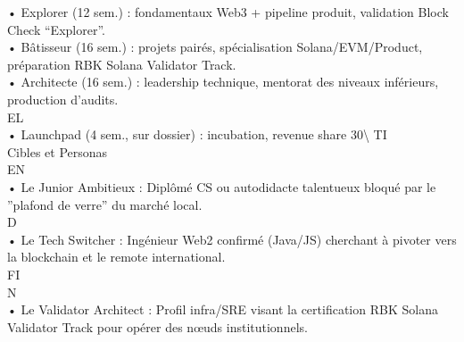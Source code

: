 \vspace{0.5em}
• Explorer (12 sem.) : fondamentaux Web3 + pipeline produit, validation Block Check “Explorer”.\\
\vspace{0.5em}
• Bâtisseur (16 sem.) : projets pairés, spécialisation Solana/EVM/Product, préparation RBK Solana Validator Track.\\
\vspace{0.5em}
• Architecte (16 sem.) : leadership technique, mentorat des niveaux inférieurs, production d’audits.\\
\vspace{0.5em}
\vspace{0.5em}
\vspace{0.5em}
\vspace{0.5em}
EL\\
• Launchpad (4 sem., sur dossier) : incubation, revenue share 30\textbackslash{}%
\vspace{0.5em}
\vspace{0.5em}
\vspace{0.5em}
\vspace{0.5em}
TI\\
Cibles et Personas\\
\vspace{0.5em}
\vspace{0.5em}
\vspace{0.5em}
\vspace{0.5em}
EN\\
• Le Junior Ambitieux : Diplômé CS ou autodidacte talentueux bloqué par le ”plafond de verre” du marché local.\\
\vspace{0.5em}
\vspace{0.5em}
\vspace{0.5em}
\vspace{0.5em}
D\\
• Le Tech Switcher : Ingénieur Web2 confirmé (Java/JS) cherchant à pivoter vers la blockchain et le remote international.\\
\vspace{0.5em}
\vspace{0.5em}
\vspace{0.5em}
\vspace{0.5em}
FI\\
N\\
• Le Validator Architect : Profil infra/SRE visant la certification RBK Solana Validator Track pour opérer des nœuds institutionnels.\\
